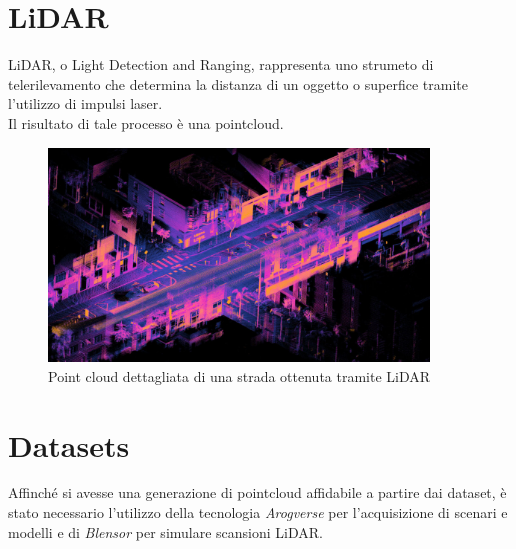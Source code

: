\documentclass[italian]{report}
\begin{document}
\section{LiDAR}
LiDAR, o Light Detection and Ranging, rappresenta uno strumeto di telerilevamento che determina la distanza di un oggetto o superfice tramite l'utilizzo di impulsi laser.\\
Il risultato di tale processo è una pointcloud.\\
\begin{figure}[H]
	\centering
	\includegraphics[width=0.9\textwidth]{LiDAR}
	\footnotesize
	\caption{Point cloud dettagliata di una strada ottenuta tramite LiDAR}
\end{figure}
\section{Datasets}
Affinché si avesse una generazione di pointcloud affidabile a partire dai dataset, è stato necessario l'utilizzo della tecnologia \textit{Arogverse} per l'acquisizione di scenari e modelli e di \textit{Blensor} per simulare scansioni LiDAR.
\end{document}

